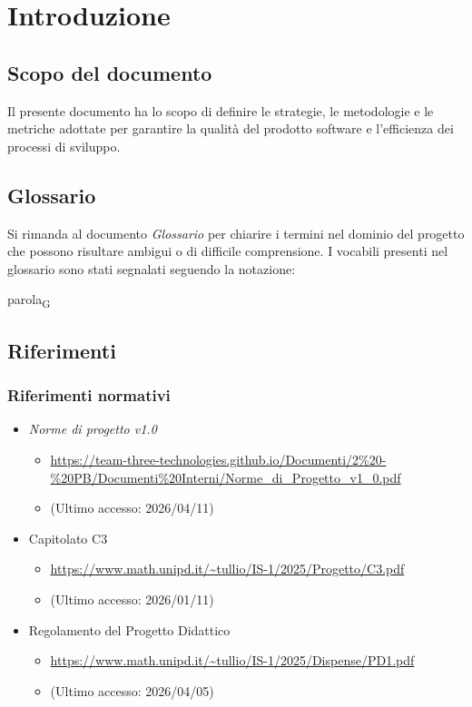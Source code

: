 \documentclass[a4paper,12pt]{article}
\begin{document}
    \section{Introduzione} {
        \subsection{Scopo del documento}
            Il presente documento ha lo scopo di definire le strategie, le metodologie e le metriche adottate per garantire la qualità del prodotto software e l'efficienza dei processi di sviluppo.

        \subsection{Glossario}
            Si rimanda al documento \textit{Glossario} per chiarire i termini nel dominio del progetto che possono risultare ambigui o di difficile comprensione. I vocabili presenti nel glossario sono stati segnalati seguendo la notazione:
            \begin{center}
                parola\textsubscript{G}
            \end{center}
        \subsection{Riferimenti}
            \subsubsection{Riferimenti normativi}
                \begin{itemize}
                    \item \textit{Norme di progetto v1.0}
                    \begin{itemize}
                        \item \url{https://team-three-technologies.github.io/Documenti/2%20-%20PB/Documenti%20Interni/Norme_di_Progetto_v1_0.pdf}
                        \item[] (Ultimo accesso: 2026/04/11)
                    \end{itemize}
                    \item Capitolato C3
                    \begin{itemize}
                        \item \url{https://www.math.unipd.it/~tullio/IS-1/2025/Progetto/C3.pdf}
                        \item[] (Ultimo accesso: 2026/01/11)
                    \end{itemize}
                    \item Regolamento del Progetto Didattico
                    \begin{itemize}
                        \item \url{https://www.math.unipd.it/~tullio/IS-1/2025/Dispense/PD1.pdf}
                        \item[] (Ultimo accesso: 2026/04/05)
                    \end{itemize}
                \end{itemize}
}
\end{document}
